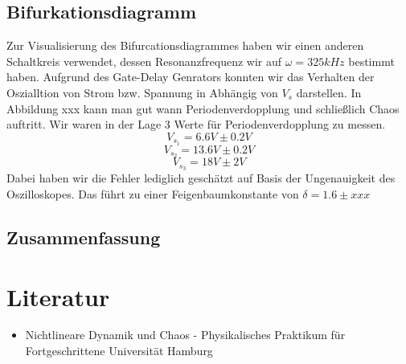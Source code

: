 \documentclass{scrartcl}
\begin{document}
\subsection { Bifurkationsdiagramm }
Zur Visualisierung des Bifurcationsdiagrammes haben wir einen anderen Schaltkreis verwendet, dessen Resonanzfrequenz wir auf $\omega=325kHz$ bestimmt haben. Aufgrund des Gate-Delay Genrators konnten wir das Verhalten der Oszialltion von Strom bzw. Spannung in Abhängig von $V_s$ darstellen. In Abbildung xxx kann man gut wann Periodenverdopplung und schließlich Chaos auftritt.
Wir waren in der Lage 3 Werte für Periodenverdopplung zu messen.
$$V_{s_1}=6.6V \pm 0.2V$$
$$V_{s_2}=13.6V \pm 0.2V$$
$$V_{s_3}=18V \pm 2V$$
Dabei haben wir die Fehler lediglich geschätzt auf Basis der Ungenauigkeit des Oszilloskopes. Das führt zu einer Feigenbaumkonstante von $\delta=1.6 \pm xxx$

\subsection { Zusammenfassung }

\section{ Literatur }
\nocite{*}
\printbibliography
\begin{itemize} 
\item Nichtlineare Dynamik und Chaos - Physikalisches Praktikum für Fortgeschrittene Universität Hamburg
\end{itemize}
\end{document}
